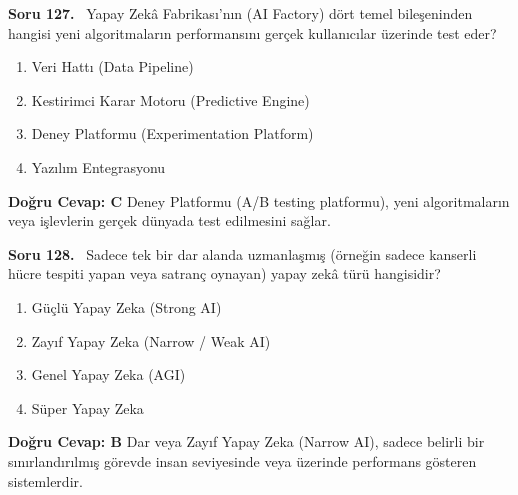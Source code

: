 \documentclass[11pt,a4paper,openany]{book}
\begin{document}
\needspace{5cm}
\vspace{8pt}
\noindent\textbf{\large\sffamily Soru 127.} \ Yapay Zekâ Fabrikası'nın (AI Factory) dört temel bileşeninden hangisi yeni algoritmaların performansını gerçek kullanıcılar üzerinde test eder?
\begin{enumerate}[label=\Alph*), leftmargin=25pt, topsep=4pt, itemsep=2pt]
    \item Veri Hattı (Data Pipeline)
    \item Kestirimci Karar Motoru (Predictive Engine)
    \item Deney Platformu (Experimentation Platform)
    \item Yazılım Entegrasyonu
\end{enumerate}
\vspace{4pt}
\begin{tcolorbox}[title=Cevap ve Açıklama, colback=gray!3!white, colframe=primarycolor!90!black, arc=2mm, fonttitle=\bfseries\sffamily, top=6pt, bottom=6pt]
    \textbf{Doğru Cevap: C}
    \vspace{2pt}
    Deney Platformu (A/B testing platformu), yeni algoritmaların veya işlevlerin gerçek dünyada test edilmesini sağlar.
\end{tcolorbox}
\vspace{10pt}

\needspace{5cm}
\vspace{8pt}
\noindent\textbf{\large\sffamily Soru 128.} \ Sadece tek bir dar alanda uzmanlaşmış (örneğin sadece kanserli hücre tespiti yapan veya satranç oynayan) yapay zekâ türü hangisidir?
\begin{enumerate}[label=\Alph*), leftmargin=25pt, topsep=4pt, itemsep=2pt]
    \item Güçlü Yapay Zeka (Strong AI)
    \item Zayıf Yapay Zeka (Narrow / Weak AI)
    \item Genel Yapay Zeka (AGI)
    \item Süper Yapay Zeka
\end{enumerate}
\vspace{4pt}
\begin{tcolorbox}[title=Cevap ve Açıklama, colback=gray!3!white, colframe=primarycolor!90!black, arc=2mm, fonttitle=\bfseries\sffamily, top=6pt, bottom=6pt]
    \textbf{Doğru Cevap: B}
    \vspace{2pt}
    Dar veya Zayıf Yapay Zeka (Narrow AI), sadece belirli bir sınırlandırılmış görevde insan seviyesinde veya üzerinde performans gösteren sistemlerdir.
\end{tcolorbox}
\vspace{10pt}
\end{document}
